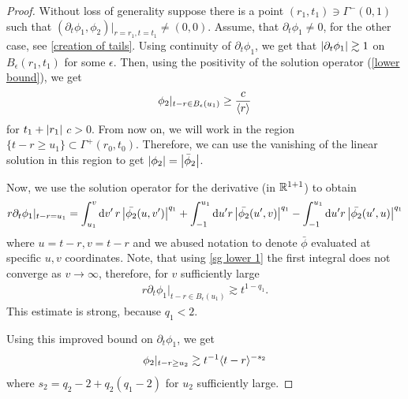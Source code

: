 \documentclass[11pt, oneside]{amsart}
\begin{document}
	\begin{proof}
		
		Without loss of generality suppose there is a point $(r_1,t_1)\ni\Gamma^-(0,1)$ such that $(\partial_t\phi_1,\phi_2)|_{r=r_1,t=t_1}\neq(0,0)$. Assume, that $\partial_t\phi_1\neq0$, for the other case, see \cref{creation of tails}. Using continuity of $\partial_t\phi_1$, we get that $\left\lvert \partial_t\phi_1\right\rvert\gtrsim1$ on $B_{\epsilon}(r_1,t_1)$ for some $\epsilon$. Then, using the positivity of the solution operator (\cref{lower bound}), we get
		\begin{equation}\label{sg lower 1}
			\begin{gathered}
				\phi_2|_{t-r\in B_\epsilon(u_1)}\geq \frac{c}{\langle r \rangle}
			\end{gathered}
		\end{equation}
		for $t_1+\left\lvert r_1\right\rvert$ $c>0$. From now on, we will work in the region $\{t-r\geq u_1\}\subset\Gamma^+(r_0,t_0)$. Therefore, we can use the vanishing of the linear solution in this region to get $\left\lvert \phi_2\right\rvert= \left\lvert \bar{\phi}_2\right\rvert$.
		
		
		Now, we use the solution operator for the derivative (in $\mathbb{R}^{1+1}$) to obtain
		\begin{equation*}
			\begin{gathered}
				r\partial_t\phi_1|_{t-r= u_1}=\int_{u_1}^v\mathrm{d} v^\prime\,r\left\lvert \bar{\phi_2}(u,v^\prime)\right\rvert^{q_1}+\int_{-1}^{u_1}\mathrm{d} u^\prime r\left\lvert \bar{\phi_2}(u^\prime,v)\right\rvert^{q_1}-\int_{-1}^{u_1}\mathrm{d} u^\prime r\left\lvert \bar{\phi_2}(u^\prime,u)\right\rvert^{q_1}
			\end{gathered}
		\end{equation*}
		where $u=t-r,v=t-r$ and we abused notation to denote $\bar{\phi}$ evaluated at specific $u,v$ coordinates.
		Note, that using \eqref{sg lower 1} the first integral does not converge as $v\to\infty$, therefore, for $v$ sufficiently large
		\begin{equation*}
			\begin{gathered}
				r\partial_t\phi_1|_{t-r\in B_\epsilon(u_1)}\gtrsim t^{1-q_1}.
			\end{gathered}
		\end{equation*}
		This estimate is strong, because $q_1<2$. 
		
		Using this improved bound on $\partial_t\phi_1$, we get
		\begin{equation*}
			\begin{gathered}
				\phi_2|_{t-r\geq u_2}\gtrsim t^{-1} \langle t-r \rangle^{-s_2}
			\end{gathered}
		\end{equation*}
		where $s_2=q_2-2+q_2(q_1-2)$ for $u_2$ sufficiently large.
		

\end{proof}
\end{document}
